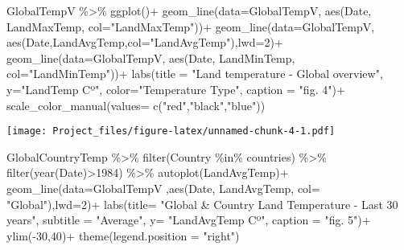 \documentclass[
]{article}
\newenvironment{Shaded}{\begin{snugshade}}{\end{snugshade}}
\newcommand{\AttributeTok}[1]{\textcolor[rgb]{0.77,0.63,0.00}{#1}}
\newcommand{\DecValTok}[1]{\textcolor[rgb]{0.00,0.00,0.81}{#1}}
\newcommand{\FunctionTok}[1]{\textcolor[rgb]{0.00,0.00,0.00}{#1}}
\newcommand{\NormalTok}[1]{#1}
\newcommand{\SpecialCharTok}[1]{\textcolor[rgb]{0.00,0.00,0.00}{#1}}
\newcommand{\StringTok}[1]{\textcolor[rgb]{0.31,0.60,0.02}{#1}}
\begin{document}
\begin{Shaded}
\begin{Highlighting}[]
\NormalTok{GlobalTempV }\SpecialCharTok{\%\textgreater{}\%} \FunctionTok{ggplot}\NormalTok{()}\SpecialCharTok{+}
  \FunctionTok{geom\_line}\NormalTok{(}\AttributeTok{data=}\NormalTok{GlobalTempV, }\FunctionTok{aes}\NormalTok{(Date, LandMaxTemp, }\AttributeTok{col=}\StringTok{"LandMaxTemp"}\NormalTok{))}\SpecialCharTok{+}
  \FunctionTok{geom\_line}\NormalTok{(}\AttributeTok{data=}\NormalTok{GlobalTempV, }\FunctionTok{aes}\NormalTok{(Date,LandAvgTemp,}\AttributeTok{col=}\StringTok{"LandAvgTemp"}\NormalTok{),}\AttributeTok{lwd=}\DecValTok{2}\NormalTok{)}\SpecialCharTok{+}
  \FunctionTok{geom\_line}\NormalTok{(}\AttributeTok{data=}\NormalTok{GlobalTempV, }\FunctionTok{aes}\NormalTok{(Date, LandMinTemp, }\AttributeTok{col=}\StringTok{"LandMinTemp"}\NormalTok{))}\SpecialCharTok{+}
  \FunctionTok{labs}\NormalTok{(}\AttributeTok{title =} \StringTok{"Land temperature {-} Global overview"}\NormalTok{,}
       \AttributeTok{y=}\StringTok{"LandTemp Cº"}\NormalTok{,}
       \AttributeTok{color=}\StringTok{"Temperature Type"}\NormalTok{,}
       \AttributeTok{caption =} \StringTok{"fig. 4"}\NormalTok{)}\SpecialCharTok{+}
  \FunctionTok{scale\_color\_manual}\NormalTok{(}\AttributeTok{values=} \FunctionTok{c}\NormalTok{(}\StringTok{"red"}\NormalTok{,}\StringTok{"black"}\NormalTok{,}\StringTok{"blue"}\NormalTok{))}
\end{Highlighting}
\end{Shaded}

\texttt{[image: Project\_files/figure-latex/unnamed-chunk-4-1.pdf]}

\begin{Shaded}
\begin{Highlighting}[]
\NormalTok{GlobalCountryTemp }\SpecialCharTok{\%\textgreater{}\%} \FunctionTok{filter}\NormalTok{(Country }\SpecialCharTok{\%in\%}\NormalTok{ countries) }\SpecialCharTok{\%\textgreater{}\%} \FunctionTok{filter}\NormalTok{(}\FunctionTok{year}\NormalTok{(Date)}\SpecialCharTok{\textgreater{}}\DecValTok{1984}\NormalTok{) }\SpecialCharTok{\%\textgreater{}\%} \FunctionTok{autoplot}\NormalTok{(LandAvgTemp)}\SpecialCharTok{+}
  \FunctionTok{geom\_line}\NormalTok{(}\AttributeTok{data=}\NormalTok{GlobalTempV ,}\FunctionTok{aes}\NormalTok{(Date, LandAvgTemp, }\AttributeTok{col=} \StringTok{"Global"}\NormalTok{),}\AttributeTok{lwd=}\DecValTok{2}\NormalTok{)}\SpecialCharTok{+}
  \FunctionTok{labs}\NormalTok{(}\AttributeTok{title=} \StringTok{"Global \& Country Land Temperature {-} Last 30 years"}\NormalTok{,}
            \AttributeTok{subtitle =} \StringTok{"Average"}\NormalTok{,}
            \AttributeTok{y=} \StringTok{"LandAvgTemp Cº"}\NormalTok{,}
       \AttributeTok{caption =} \StringTok{"fig. 5"}\NormalTok{)}\SpecialCharTok{+}
  \FunctionTok{ylim}\NormalTok{(}\SpecialCharTok{{-}}\DecValTok{30}\NormalTok{,}\DecValTok{40}\NormalTok{)}\SpecialCharTok{+}
  \FunctionTok{theme}\NormalTok{(}\AttributeTok{legend.position =} \StringTok{"right"}\NormalTok{)}
\end{Highlighting}
\end{Shaded}
\end{document}
